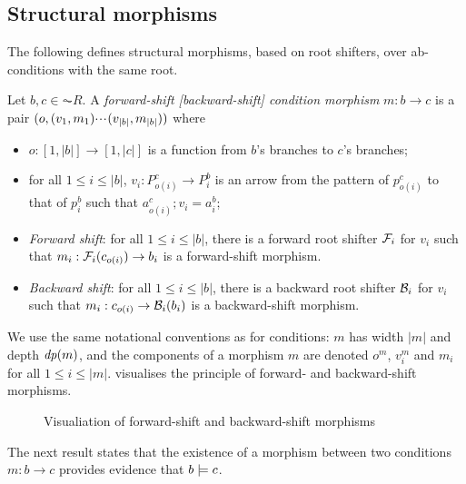 \subsection{Structural morphisms}

The following defines structural morphisms, based on root shifters, over ab-conditions with the same root.

\begin{definition}
  Let $b,c \in \AC{R}$. A \emph{forward-shift [backward-shift] condition morphism} $m: b \to c$ is a pair $(o,(v_1,m_1){\cdotp\mkern-2mu\cdotp\mkern-2mu\cdotp\mkern1mu} (v_{|b|},m_{|b|}))$ where
  \begin{itemize}[topsep=\smallskipamount]
  \item $o:[1,|b|]\to[1,|c|]$ is a function from $b$'s branches to $c$'s branches;
  \item for all $1\leq i\leq |b|$, $v_i:P^c_{o(i)}\to P^b_i$ is an arrow from the pattern of $p^c_{o(i)}$ to that of $p^b_i$ such that $a^c_{o(i)};v_i=a^b_i$;
  \item\emph{Forward shift}: for all $1\leq i\leq |b|$, there is a forward root shifter $\mathcal{F}_i$ for $v_i$ such that $m_i:\mathcal{F}_i(c_{o(i)})\rightarrow b_i$ is a forward-shift morphism.
  \item\emph{Backward shift}: for all $1\leq i\leq |b|$, there is a backward root shifter $\mathcal{B}_i$ for $v_i$ such that $m_i:c_{o(i)}\rightarrow \mathcal{B}_i(b_i)$ is a backward-shift morphism.
  \end{itemize}
\end{definition}
%
We use the same notational conventions as for conditions: $m$ has width $|m|$ and depth $\mathit{dp}(m)$, and the components of a morphism $m$ are denoted $o^m$, $v^m_i$ and $m_i$ for all $1\leq i\leq |m|$.  visualises the principle of forward- and backward-shift morphisms.
%
\begin{figure}[t]
\centering

\caption{Visualiation of forward-shift and backward-shift morphisms}
\end{figure}
%
The next result states that the existence of a morphism between two conditions $m: b \to c$ provides evidence that $b\models c$.

